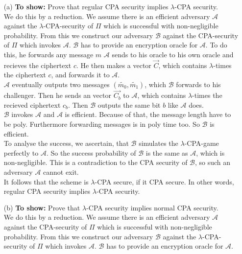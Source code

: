\begin{itemize}
\item [(a)]
	\textbf{To show:} Prove that regular CPA security implies \(\lambda\)-CPA security.\\
	We do this by a reduction. We assume there is an efficient adversary \(\mathcal{A}\) against the \(\lambda\)-CPA-security of \(\Pi\) which is successful with non-negligible probability. From this we construct our adversary \(\mathcal{B}\) against the CPA-security of \(\Pi\) which invokes \(\mathcal{A}\). \(\mathcal{B}\) has to provide an encryption oracle for \(\mathcal{A}\).
	To do this, he forwards any message \(m\) \(\mathcal{A}\) sends to his oracle to his own oracle and recieves the ciphertext \(c\). He then makes a vector \(\vec{C}\), which contains \(\lambda\)-times the ciphertext \(c\), and forwards it to \(\mathcal{A}\). \\
	\(\mathcal{A}\) eventually outputs two messages \((\widetilde{m_0}, \widetilde{m_1})\), which \(\mathcal{B}\) forwards to his challenger. Then he sends an vector \(\vec{C_b}\) to \(\mathcal{A}\), which contains  \(\lambda\)-times the recieved ciphertext \(c_b\). Then \(\mathcal{B}\) outputs the same bit \(b\) like \(\mathcal{A}\) does. \\
	\(\mathcal{B}\) invokes \(\mathcal{A}\) and \(\mathcal{A}\) is efficient. Because of that, the message length have to be poly. Furthermore forwarding messages is in poly time too. So \(\mathcal{B}\) is efficient.\\
	To analyse the success, we ascertain, that \(\mathcal{B}\) simulates the \(\lambda\)-CPA-game perfectly to \(\mathcal{A}\). So the success probability of \(\mathcal{B}\) is the same as \(\mathcal{A}\), which is non-negligible. This is a contradiction to the CPA security of \(\mathcal{B}\), so such an adversary \(\mathcal{A}\) cannot exit. \\
	It follows that the scheme is \(\lambda\)-CPA secure, if it CPA secure. In other words, regular CPA security implies \(\lambda\)-CPA security.
\item [(b)]
	\textbf{To show:} Prove that \(\lambda\)-CPA security implies normal CPA security.\\
	We do this by a reduction. We assume there is an efficient adversary \(\mathcal{A}\) against the CPA-security of \(\Pi\) which is successful with non-negligible probability. From this we construct our adversary \(\mathcal{B}\) against the \(\lambda\)-CPA-security of \(\Pi\) which invokes \(\mathcal{A}\). \(\mathcal{B}\) has to provide an encryption oracle for \(\mathcal{A}\).

\end{itemize}
